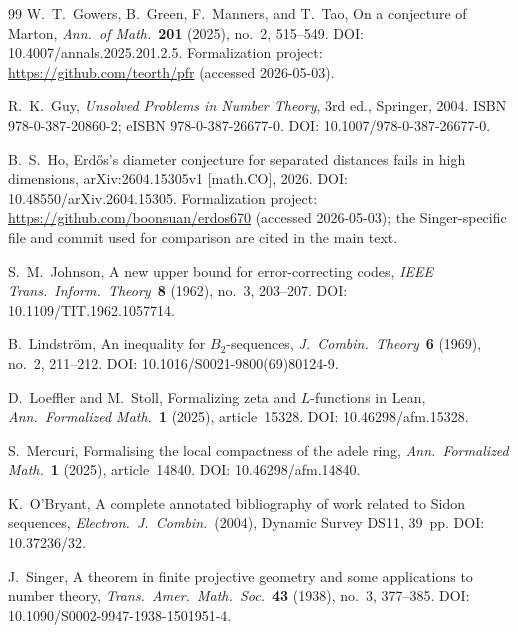 \documentclass[11pt,a4paper]{article}
\begin{document}
\begin{thebibliography}{99}
W.~T.~Gowers, B.~Green, F.~Manners, and T.~Tao,
On a conjecture of Marton,
\emph{Ann.\ of Math.}\ \textbf{201} (2025), no.~2, 515--549.
DOI: 10.4007/annals.2025.201.2.5.
Formalization project: \url{https://github.com/teorth/pfr} (accessed
2026-05-03).

R.~K.~Guy,
\emph{Unsolved Problems in Number Theory}, 3rd ed.,
Springer, 2004. ISBN 978-0-387-20860-2; eISBN 978-0-387-26677-0.
DOI: 10.1007/978-0-387-26677-0.

B.~S.~Ho,
Erd\H{o}s's diameter conjecture for separated distances fails in high
dimensions,
arXiv:2604.15305v1 [math.CO], 2026.
DOI: 10.48550/arXiv.2604.15305.
Formalization project: \url{https://github.com/boonsuan/erdos670} (accessed
2026-05-03); the Singer-specific file and commit used for comparison are cited
in the main text.

S.~M.~Johnson,
A new upper bound for error-correcting codes,
\emph{IEEE Trans.\ Inform.\ Theory}\ \textbf{8} (1962), no.~3, 203--207.
DOI: 10.1109/TIT.1962.1057714.

B.~Lindstr\"om,
An inequality for $B_2$-sequences,
\emph{J.\ Combin.\ Theory}\ \textbf{6} (1969), no.~2, 211--212.
DOI: 10.1016/S0021-9800(69)80124-9.

D.~Loeffler and M.~Stoll,
Formalizing zeta and $L$-functions in Lean,
\emph{Ann.\ Formalized Math.}\ \textbf{1} (2025), article~15328.
DOI: 10.46298/afm.15328.

S.~Mercuri,
Formalising the local compactness of the adele ring,
\emph{Ann.\ Formalized Math.}\ \textbf{1} (2025), article~14840.
DOI: 10.46298/afm.14840.

K.~O'Bryant,
A complete annotated bibliography of work related to Sidon sequences,
\emph{Electron.\ J.\ Combin.}\ (2004), Dynamic Survey DS11, 39~pp.
DOI: 10.37236/32.

J.~Singer,
A theorem in finite projective geometry and some applications to number theory,
\emph{Trans.\ Amer.\ Math.\ Soc.}\ \textbf{43} (1938), no.~3, 377--385.
DOI: 10.1090/S0002-9947-1938-1501951-4.

\end{thebibliography}
\end{document}
